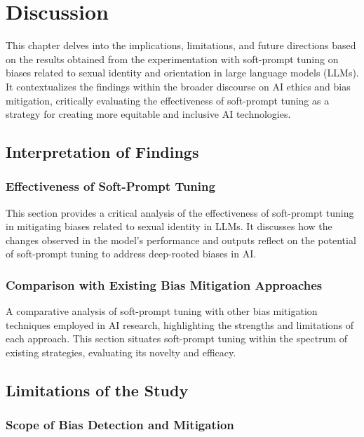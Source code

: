 \chapter{Discussion}

This chapter delves into the implications, limitations, and future directions based on the results obtained from the experimentation with soft-prompt tuning on biases related to sexual identity and orientation in large language models (LLMs). It contextualizes the findings within the broader discourse on AI ethics and bias mitigation, critically evaluating the effectiveness of soft-prompt tuning as a strategy for creating more equitable and inclusive AI technologies.

\section{Interpretation of Findings}

\subsection{Effectiveness of Soft-Prompt Tuning}

This section provides a critical analysis of the effectiveness of soft-prompt tuning in mitigating biases related to sexual identity in LLMs. It discusses how the changes observed in the model's performance and outputs reflect on the potential of soft-prompt tuning to address deep-rooted biases in AI.

\subsection{Comparison with Existing Bias Mitigation Approaches}

A comparative analysis of soft-prompt tuning with other bias mitigation techniques employed in AI research, highlighting the strengths and limitations of each approach. This section situates soft-prompt tuning within the spectrum of existing strategies, evaluating its novelty and efficacy.

\section{Limitations of the Study}

\subsection{Scope of Bias Detection and Mitigation}

